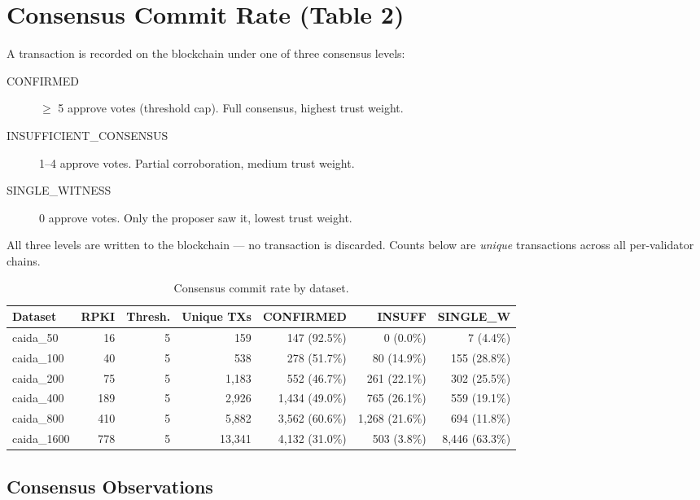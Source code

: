\documentclass[10pt,a4paper]{article}
\begin{document}
\newpage
\section{Consensus Commit Rate (Table 2)}
\label{sec:consensus}

A transaction is recorded on the blockchain under one of three
consensus levels:
\begin{description}
\item[CONFIRMED] $\geq$ 5 approve votes (threshold cap). Full consensus, highest trust weight.
\item[INSUFFICIENT\_CONSENSUS] 1--4 approve votes. Partial corroboration, medium trust weight.
\item[SINGLE\_WITNESS] 0 approve votes. Only the proposer saw it, lowest trust weight.
\end{description}
All three levels are written to the blockchain --- no transaction is
discarded. Counts below are \emph{unique} transactions across all
per-validator chains.

\begin{table}[h]
\centering
\caption{Consensus commit rate by dataset.}
\begin{tabular}{lrrrrrr}
\toprule
Dataset & RPKI & Thresh. & Unique TXs & CONFIRMED & INSUFF & SINGLE\_W \\
\midrule

caida\_50 & 16 & 5 & 159 & 147 (92.5\%) & 0 (0.0\%) & 7 (4.4\%) \\
caida\_100 & 40 & 5 & 538 & 278 (51.7\%) & 80 (14.9\%) & 155 (28.8\%) \\
caida\_200 & 75 & 5 & 1,183 & 552 (46.7\%) & 261 (22.1\%) & 302 (25.5\%) \\
caida\_400 & 189 & 5 & 2,926 & 1,434 (49.0\%) & 765 (26.1\%) & 559 (19.1\%) \\
caida\_800 & 410 & 5 & 5,882 & 3,562 (60.6\%) & 1,268 (21.6\%) & 694 (11.8\%) \\
caida\_1600 & 778 & 5 & 13,341 & 4,132 (31.0\%) & 503 (3.8\%) & 8,446 (63.3\%) \\
\bottomrule
\end{tabular}
\end{table}

\subsection{Consensus Observations}
\end{document}
